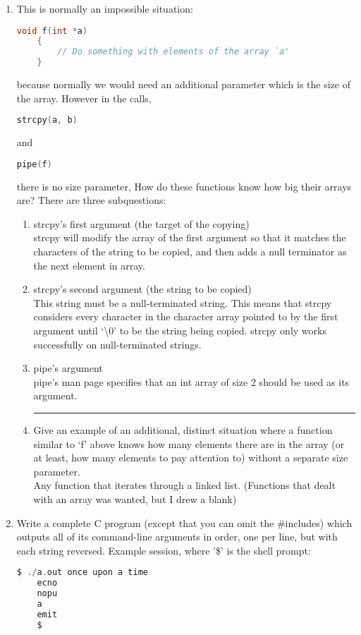 \documentclass[11pt]{article}
\begin{document}
\begin{enumerate}
		\newpage
		\item This is normally an impossible situation:
			\begin{lstlisting}[language=c]
	void f(int *a)
	{
		// Do something with elements of the array `a'
	}\end{lstlisting}
			because normally we would need an additional parameter which is the size of the array. However in the calls, \begin{lstlisting}[language=c]
	strcpy(a, b)\end{lstlisting}
and \begin{lstlisting}[language=c]
	pipe(f)\end{lstlisting}
			there is no size parameter, How do these functions know how big their arrays are? There are three subquestions:
				\begin{enumerate}
					\item strcpy's first argument (the target of the copying) \\
						strcpy will modify the array of the first argument so that it matches the characters of the string to be copied, and then adds a null terminator as the next element in array.
					\item strcpy's second argument (the string to be copied)\\
						This string must be a null-terminated string. This means that strcpy considers every character in the character array pointed to by the first argument until `\textbackslash 0' to be the string being copied. strcpy only works successfully on null-terminated strings.
					\item pipe's argument\\
						pipe's man page specifies that an int array of size 2 should be used as its argument.\\
					\rule{6cm}{1pt}
					\item Give an example of an additional, distinct situation where a function similar to `f' above knows how many elements there are in the array (or at least, how many elements to pay attention to) without a separate size parameter.\\
						Any function that iterates through a linked list. (Functions that dealt with an array was wanted,  but I drew a blank)
				\end{enumerate}

			\newpage
			\item Write a complete C program (except that you can omit the \#includes) which outputs all of its command-line arguments in order, one per line, but with each string reversed. Example session, where '\$' is the shell prompt: \begin{lstlisting}[language=c]
	$ ./a.out once upon a time
	ecno
	nopu
	a
	emit
	$\end{lstlisting}
				


\end{enumerate}
\end{document}
